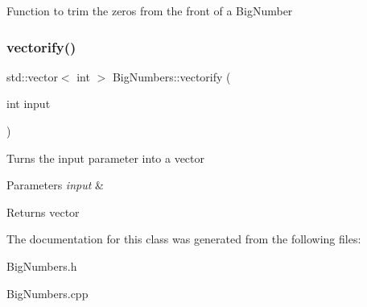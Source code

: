 Function to trim the zero\textquotesingle{}s from the front of a Big\+Number \mbox{\label{classBigNumbers_a8ad0e43ccbd70975c217fa96e26d50a3}} 
\subsubsection{\texorpdfstring{vectorify()}{vectorify()}}
{\footnotesize\ttfamily std\+::vector$<$ int $>$ Big\+Numbers\+::vectorify (\begin{DoxyParamCaption}\item[{int}]{input }\end{DoxyParamCaption})}

Turns the input parameter into a vector 
\begin{DoxyParams}{Parameters}
{\em input} & \\
\hline
\end{DoxyParams}
\begin{DoxyReturn}{Returns}
vector 
\end{DoxyReturn}


The documentation for this class was generated from the following files\+:\begin{DoxyCompactItemize}
\item 
Big\+Numbers.\+h\item 
Big\+Numbers.\+cpp\end{DoxyCompactItemize}
